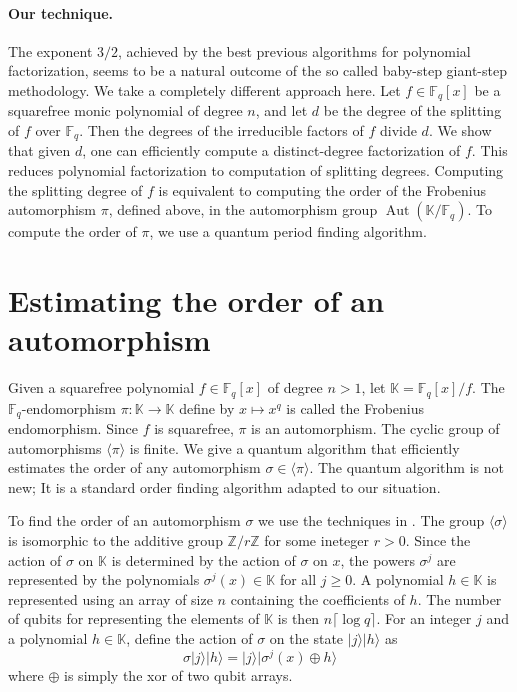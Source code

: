 \documentclass{article}
\theoremstyle{plain}
\theoremstyle{definition}
\newcommand{\lrang}[1]{\langle#1\rangle}
\newcommand{\ldbrac}[1]{\lvert#1\rangle}
\DeclareMathOperator{\Aut}{Aut}
\def\K{\ensuremath{\mathbb{K}}}
\def\Z{\ensuremath{\mathbb{Z}}}
\def\F{\ensuremath{\mathbb{F}}}
\begin{document}
\paragraph{Our technique.}
The exponent $3/2$, achieved by the best previous algorithms for polynomial factorization, seems to 
be a natural outcome of the so called baby-step giant-step methodology. We take a completely 
different approach here. Let $f \in \F_q[x]$ be a squarefree monic polynomial of degree $n$, and let 
$d$ be the degree of the splitting of $f$ over $\F_q$. Then the degrees of the irreducible factors 
of $f$ divide $d$. We show that given $d$, one can efficiently compute a distinct-degree 
factorization of $f$. This reduces polynomial factorization to computation of splitting degrees. 
Computing the splitting degree of $f$ is equivalent to computing the order of the Frobenius 
automorphism $\pi$, defined above, in the automorphism group $\Aut(\K / \F_q)$. To compute the order 
of $\pi$, we use a quantum period finding algorithm. 





\section{Estimating the order of an automorphism}
\label{sec:ord-frob}

Given a squarefree polynomial $f \in \F_q[x]$ of degree $n > 1$, let $\K = \F_q[x] / f$. The 
$\F_q$-endomorphism $\pi: \K \rightarrow \K$ define by $x \mapsto x^q$ is called the Frobenius 
endomorphism. Since $f$ is squarefree, $\pi$ is an automorphism. The cyclic group of automorphisms 
$\lrang{\pi}$ is finite. We give a quantum algorithm that efficiently estimates the order of any 
automorphism $\sigma \in \lrang{\pi}$. The quantum algorithm is not new; It is a standard order 
finding algorithm adapted to our situation. 

To find the order of an automorphism $\sigma$ we use the techniques in \cite{kaye2007introduction, 
nielsen2010quantum}. The group $\lrang{\sigma}$ is isomorphic to the additive group $\Z/r\Z$ for 
some ineteger $r > 0$. Since the action of $\sigma$ on $\K$ is determined by the action of $\sigma$ 
on $x$, the powers $\sigma^j$ are represented by the polynomials $\sigma^j(x) \in \K$ for all $j 
\ge 0$. A polynomial $h \in \K$ is represented using an array of size $n$ containing the 
coefficients of $h$. The number of qubits for representing the elements of $\K$ is then $n\lceil 
\log q \rceil$. For an integer $j$ and a polynomial $h \in \K$, define the action of $\sigma$ on the 
state $\ldbrac{j} \ldbrac{h}$ as
\begin{equation}
	\label{equ:sig-act}
	\sigma \ldbrac{j}\ldbrac{h} = \ldbrac{j}\ldbrac{\sigma^j(x) \oplus h}
\end{equation}
where $\oplus$ is simply the xor of two qubit arrays.
\end{document}
